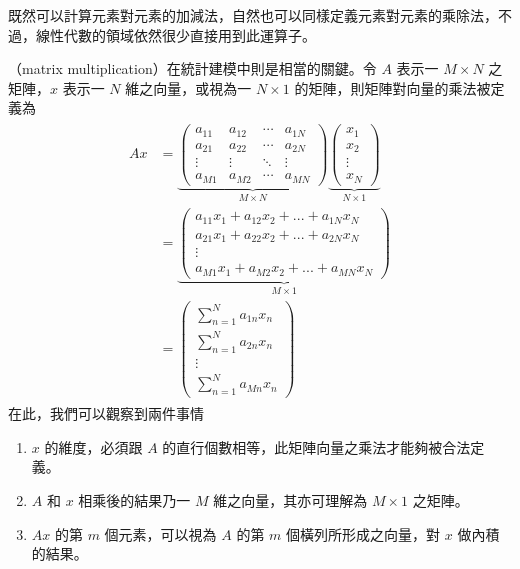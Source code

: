 \documentclass[letterpaper,10pt,english]{sphinxmanual}
\begin{document}
既然可以計算元素對元素的加減法，自然也可以同樣定義元素對元素的乘除法，不過，線性代數的領域依然很少直接用到此運算子。

（matrix multiplication）在統計建模中則是相當的關鍵。令 \(A\) 表示一 \(M \times N\) 之矩陣，\(x\) 表示一 \(N\) 維之向量，或視為一 \(N \times 1\) 的矩陣，則矩陣對向量的乘法被定義為
\begin{equation*}
\begin{split}
\begin{aligned}
Ax &=  \underbrace{\begin{pmatrix}
  a_{11} & a_{12} & \cdots & a_{1N} \\
  a_{21} & a_{22} & \cdots & a_{2N} \\
  \vdots  & \vdots  & \ddots & \vdots  \\
  a_{M1} & a_{M2} & \cdots & a_{MN}
 \end{pmatrix}}_{M \times N}
\underbrace{\begin{pmatrix}
x_1 \\
x_2 \\
\vdots \\
x_N
\end{pmatrix}}_{N \times 1} \\
&=
\underbrace{\begin{pmatrix}
  a_{11} x_1 + a_{12} x_2 + ... + a_{1N} x_N \\
  a_{21} x_1 + a_{22} x_2 + ... + a_{2N} x_N \\
  \vdots \\
  a_{M1} x_1 + a_{M2} x_2 + ... + a_{MN} x_N
 \end{pmatrix}}_{M \times 1}\\
&=
\begin{pmatrix}
  \sum_{n=1}^N a_{1n} x_n \\
  \sum_{n=1}^N a_{2n} x_n\\
  \vdots \\
  \sum_{n=1}^N a_{Mn} x_n
 \end{pmatrix}
\end{aligned}
\end{split}
\end{equation*}
在此，我們可以觀察到兩件事情
\begin{enumerate}
%
\item {} 
\(x\) 的維度，必須跟 \(A\) 的直行個數相等，此矩陣向量之乘法才能夠被合法定義。

\item {} 
\(A\) 和 \(x\) 相乘後的結果乃一 \(M\) 維之向量，其亦可理解為 \(M \times 1\) 之矩陣。

\item {} 
\(Ax\) 的第 \(m\) 個元素，可以視為 \(A\) 的第 \(m\) 個橫列所形成之向量，對 \(x\) 做內積的結果。

\end{enumerate}
\end{document}
